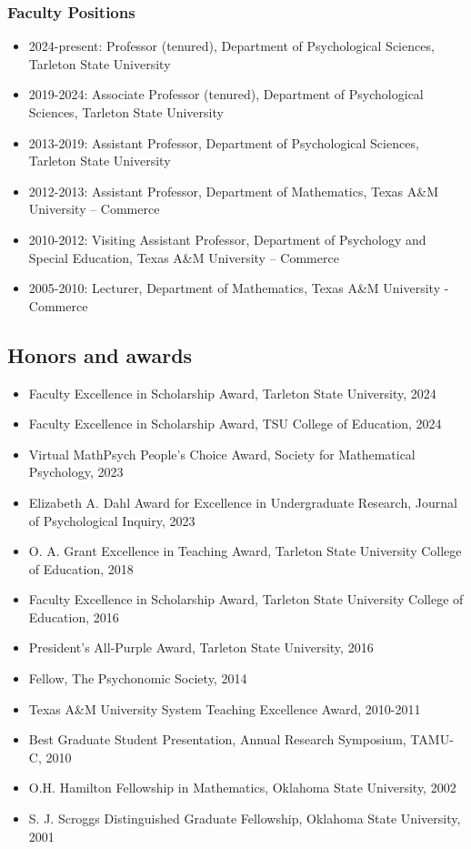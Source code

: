 \documentclass[article,10pt]{article}
\begin{document}
\subsubsection*{Faculty Positions}
\label{sec:org65d7c51}
\begin{itemize}
\item 2024-present: Professor (tenured), Department of Psychological Sciences, Tarleton State University
\item 2019-2024: Associate Professor (tenured), Department of Psychological Sciences, Tarleton State University
\item 2013-2019: Assistant Professor, Department of Psychological Sciences, Tarleton State University
\item 2012-2013: Assistant Professor, Department of Mathematics, Texas A\&M University – Commerce
\item 2010-2012: Visiting Assistant Professor, Department of Psychology and Special Education, Texas A\&M University – Commerce
\item 2005-2010: Lecturer, Department of Mathematics, Texas A\&M University - Commerce
\end{itemize}

\subsection*{Honors and awards}
\label{sec:orgf20a345}
\begin{itemize}
\item Faculty Excellence in Scholarship Award, Tarleton State University, 2024
\item Faculty Excellence in Scholarship Award, TSU College of Education, 2024
\item Virtual MathPsych People's Choice Award, Society for Mathematical Psychology, 2023
\item Elizabeth A. Dahl Award for Excellence in Undergraduate Research, Journal of Psychological Inquiry, 2023
\item O. A. Grant Excellence in Teaching Award, Tarleton State University College of Education, 2018
\item Faculty Excellence in Scholarship Award, Tarleton State University College of Education, 2016
\item President's All-Purple Award, Tarleton State University, 2016
\item Fellow, The Psychonomic Society, 2014
\item Texas A\&M University System Teaching Excellence Award, 2010-2011
\item Best Graduate Student Presentation, Annual Research Symposium, TAMU-C, 2010
\item O.H. Hamilton Fellowship in Mathematics, Oklahoma State University, 2002
\item S. J. Scroggs Distinguished Graduate Fellowship, Oklahoma State University, 2001
\end{itemize}
\end{document}
